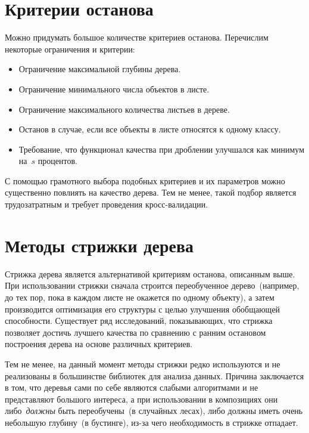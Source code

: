 \documentclass[12pt,fleqn]{article}
\begin{document}


\section{Критерии останова}
Можно придумать большое количестве критериев останова.
Перечислим некоторые ограничения и критерии:
\begin{itemize}
    \item Ограничение максимальной глубины дерева.
    \item Ограничение минимального числа объектов в листе.
    \item Ограничение максимального количества листьев в дереве.
    \item Останов в случае, если все объекты в листе относятся к одному классу.
    \item Требование, что функционал качества при дроблении улучшался как минимум на~$s$ процентов.
\end{itemize}

С помощью грамотного выбора подобных критериев и их параметров можно существенно повлиять
на качество дерева.
Тем не менее, такой подбор является трудозатратным и требует проведения кросс-валидации.

\section{Методы стрижки дерева}
Стрижка дерева является альтернативой критериям останова, описанным выше.
При использовании стрижки сначала строится переобученное дерево~(например, до тех пор, пока
в каждом листе не окажется по одному объекту), а затем производится оптимизация его структуры
с целью улучшения обобщающей способности.
Существует ряд исследований, показывающих, что стрижка позволяет достичь лучшего качества
по сравнению с ранним остановом построения дерева на основе различных критериев.

Тем не менее, на данный момент методы стрижки редко используются
и не реализованы в большинстве библиотек для анализа данных.
Причина заключается в том, что деревья сами по себе являются слабыми алгоритмами и не представляют большого интереса,
а при использовании в композициях они либо~\emph{должны} быть переобучены~(в случайных лесах),
либо должны иметь очень небольшую глубину~(в бустинге), из-за чего необходимость в стрижке отпадает.
\end{document}
